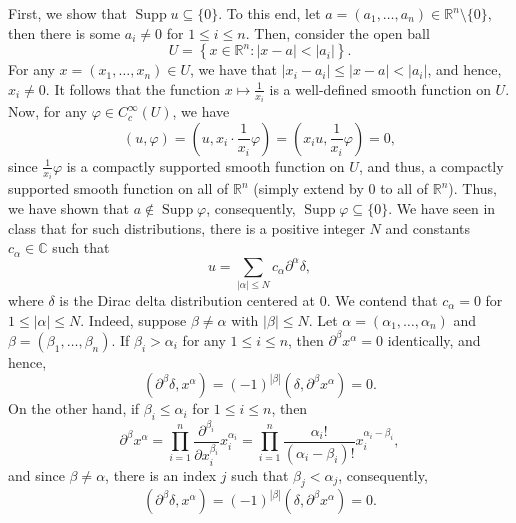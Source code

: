 \documentclass[10pt]{amsart}
\theoremstyle{thmstyle}
\theoremstyle{defstyle}
\newcommand{\R}{\mathbb{R}}
\newcommand{\bbC}{\mathbb{C}}
\newcommand{\Supp}{\operatorname{Supp}}
\renewcommand{\le}{\leqslant}
\begin{document}
First, we show that $\Supp u\subseteq\{0\}$. To this end, let $a = (a_1,\dots,a_n)\in\R^n\setminus\{0\}$, then there is some $a_i\ne 0$ for $1\le i\le n$. Then, consider the open ball 
\begin{equation*}
	U = \left\{x\in\R^n\colon |x - a| < |a_i|\right\}.
\end{equation*}
For any $x = (x_1,\dots,x_n)\in U$, we have that $|x_i - a_i|\le |x - a| < |a_i|$, and hence, $x_i\ne 0$. It follows that the function $x\mapsto\frac{1}{x_i}$ is a well-defined smooth function on $U$. Now, for any $\varphi\in C_c^\infty(U)$, we have 
\begin{equation*}
	(u, \varphi) = \left(u, x_i\cdot\frac{1}{x_i}\varphi\right) = \left(x_iu, \frac{1}{x_i}\varphi\right) = 0,
\end{equation*}
since $\frac{1}{x_i}\varphi$ is a compactly supported smooth function on $U$, and thus, a compactly supported smooth function on all of $\R^n$ (simply extend by $0$ to all of $\R^n$). Thus, we have shown that $a\notin\Supp\varphi$, consequently, $\Supp\varphi\subseteq\{0\}$. We have seen in class that for such distributions, there is a positive integer $N$ and constants $c_\alpha\in\bbC$ such that 
\begin{equation*}
	u = \sum_{|\alpha|\le N} c_\alpha\partial^\alpha\delta,
\end{equation*}
where $\delta$ is the Dirac delta distribution centered at $0$. We contend that $c_\alpha = 0$ for $1\le |\alpha|\le N$. Indeed, suppose $\beta\ne\alpha$ with $|\beta|\le N$. Let $\alpha = (\alpha_1,\dots,\alpha_n)$ and $\beta = (\beta_1,\dots,\beta_n)$. If $\beta_i > \alpha_i$ for any $1\le i\le n$, then $\partial^\beta x^\alpha = 0$ identically, and hence,
\begin{equation*}
	\left(\partial^\beta\delta, x^\alpha\right) = (-1)^{|\beta|}\left(\delta, \partial^\beta x^\alpha\right) = 0.
\end{equation*}
On the other hand, if $\beta_i\le\alpha_i$ for $1\le i\le n$, then 
\begin{equation*}
	\partial^\beta x^\alpha = \prod_{i = 1}^n\frac{\partial^{\beta_i}}{\partial x_i^{\beta_i}}x_i^{\alpha_i} = \prod_{i = 1}^n\frac{\alpha_i!}{(\alpha_i - \beta_i)!}x_i^{\alpha_i - \beta_i},
\end{equation*}
and since $\beta\ne\alpha$, there is an index $j$ such that $\beta_j < \alpha_j$, consequently, 
\begin{equation*}
	\left(\partial^\beta\delta, x^\alpha \right) = (-1)^{|\beta|}\left(\delta, \partial^\beta x^\alpha\right) = 0.
\end{equation*}
\end{document}
